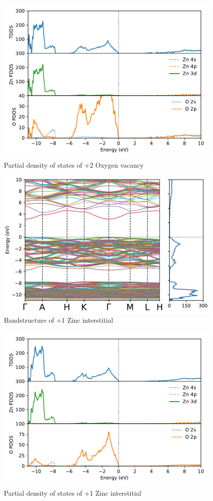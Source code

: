 \begin{figure}[tbh!]
	\centering
	\includegraphics[width=0.7\linewidth]{"images/rnd/dos-pdos_O_vac-p2"}
	\caption[Partial density of states of +2 Oxygen vacancy]{Partial density of states of +2 Oxygen vacancy}
\end{figure}

\begin{figure}[tbh!]
	\centering
	\includegraphics[width=0.7\linewidth]{"images/rnd/band-dos_Zn_i-p1"}
	\caption[Bandstructure of +1 Zinc interstitial]{Bandstructure of +1 Zinc interstitial}
\end{figure}

\begin{figure}[tbh!]
	\centering
	\includegraphics[width=0.7\linewidth]{"images/rnd/dos-pdos_Zn_i-p1"}
	\caption[Partial density of states of +1 Zinc interstitial]{Partial density of states of +1 Zinc interstitial }
\end{figure}

